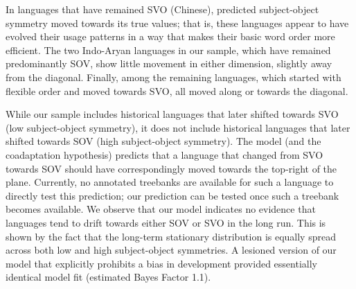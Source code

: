 \documentclass[11pt,a4paper]{article}
\newcommand\comment[1]{{\color{red}#1}}
\newcommand\mhahn[1]{{\color{red}(#1)}}
\begin{document}
In languages that have remained SVO (Chinese), predicted subject-object symmetry moved towards its true values; that is, these languages appear to have evolved their usage patterns in a way that makes their basic word order more efficient.
The two Indo-Aryan languages in our sample, which have remained predominantly SOV, show little movement in either dimension, slightly away from the diagonal.
Finally, among the remaining languages, which started with flexible order and moved towards SVO, all moved along or towards the diagonal.



While our sample includes historical languages that later shifted towards SVO (low subject-object symmetry), it does not include historical languages that later shifted towards SOV (high subject-object symmetry).
The model (and the coadaptation hypothesis) predicts that a language that changed from SVO towards SOV should have correspondingly moved towards the top-right of the plane. 
Currently, no annotated treebanks are available for such a language to directly test this prediction; our prediction can be tested once such a treebank becomes available.
We observe that our model indicates no evidence that languages tend to drift towards either SOV or SVO in the long run.
This is shown by the fact that the long-term stationary distribution is equally spread across both low and high subject-object symmetries.
A lesioned version of our model that explicitly prohibits a bias in development provided essentially identical model fit (estimated Bayes Factor 1.1).
\end{document}

